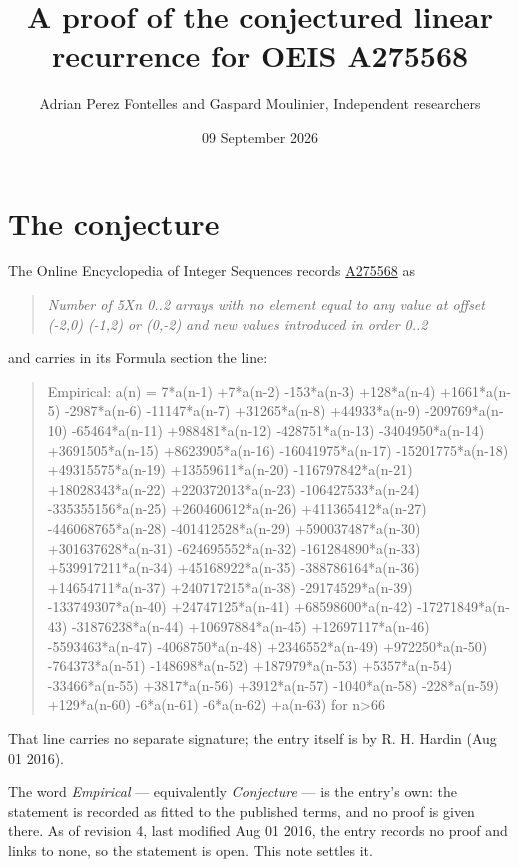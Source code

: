 \documentclass[11pt]{article}
\title{A proof of the conjectured linear recurrence for OEIS A275568}
\author{Adrian Perez Fontelles and Gaspard Moulinier, Independent researchers}
\date{09 September 2026}
\theoremstyle{definition}
\begin{document}
\maketitle
\section{The conjecture}

The Online Encyclopedia of Integer Sequences records \href{https://oeis.org/A275568}{A275568} as

\begin{quote}\itshape Number of 5Xn 0..2 arrays with no element equal to any value at offset (-2,0) (-1,2) or (0,-2) and new values introduced in order 0..2\end{quote}

and carries in its Formula section the line:

\begin{quote}\ttfamily Empirical: a(n) = 7*a(n-1) +7*a(n-2) -153*a(n-3) +128*a(n-4) +1661*a(n-5) -2987*a(n-6) -11147*a(n-7) +31265*a(n-8) +44933*a(n-9) -209769*a(n-10) -65464*a(n-11) +988481*a(n-12) -428751*a(n-13) -3404950*a(n-14) +3691505*a(n-15) +8623905*a(n-16) -16041975*a(n-17) -15201775*a(n-18) +49315575*a(n-19) +13559611*a(n-20) -116797842*a(n-21) +18028343*a(n-22) +220372013*a(n-23) -106427533*a(n-24) -335355156*a(n-25) +260460612*a(n-26) +411365412*a(n-27) -446068765*a(n-28) -401412528*a(n-29) +590037487*a(n-30) +301637628*a(n-31) -624695552*a(n-32) -161284890*a(n-33) +539917211*a(n-34) +45168922*a(n-35) -388786164*a(n-36) +14654711*a(n-37) +240717215*a(n-38) -29174529*a(n-39) -133749307*a(n-40) +24747125*a(n-41) +68598600*a(n-42) -17271849*a(n-43) -31876238*a(n-44) +10697884*a(n-45) +12697117*a(n-46) -5593463*a(n-47) -4068750*a(n-48) +2346552*a(n-49) +972250*a(n-50) -764373*a(n-51) -148698*a(n-52) +187979*a(n-53) +5357*a(n-54) -33466*a(n-55) +3817*a(n-56) +3912*a(n-57) -1040*a(n-58) -228*a(n-59) +129*a(n-60) -6*a(n-61) -6*a(n-62) +a(n-63) for n>66\end{quote}

That line carries no separate signature; the entry itself is by R. H. Hardin (Aug 01 2016).

The word {\itshape Empirical} --- equivalently {\itshape Conjecture} --- is the entry's own: the statement is recorded as fitted to the published terms, and no proof is given there. As of revision 4, last modified Aug 01 2016, the entry records no proof and links to none, so the statement is open. This note settles it.
\end{document}
